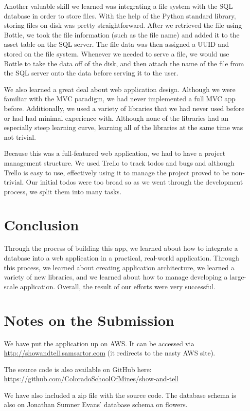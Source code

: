 \documentclass[12pt]{article}
\begin{document}
Another valuable skill we learned was integrating a file system with the SQL
database in order to store files. With the help of the Python standard library,
storing files on disk was pretty straightforward. After we retrieved the file
using Bottle, we took the file information (such as the file name) and added it
to the asset table on the SQL server. The file data was then assigned a UUID and
stored on the file system. Whenever we needed to serve a file, we would use
Bottle to take the data off of the disk, and then attach the name of the file
from the SQL server onto the data before serving it to the user.

We also learned a great deal about web application design. Although we were
familiar with the MVC paradigm, we had never implemented a full MVC app before.
Additionally, we used a variety of libraries that we had never used before or
had had minimal experience with. Although none of the libraries had an
especially steep learning curve, learning all of the libraries at the same time
was not trivial.

Because this was a full-featured web application, we had to have a project
management structure. We used Trello to track todos and bugs and although Trello
is easy to use, effectively using it to manage the project proved to be
non-trivial. Our initial todos were too broad so as we went through the
development process, we split them into many tasks.

\section{Conclusion}
Through the process of building this app, we learned about how to integrate a
database into a web application in a practical, real-world application. Through
this process, we learned about creating application architecture, we learned a
variety of new libraries, and we learned about how to manage developing a
large-scale application. Overall, the result of our efforts were very
successful.

\section{Notes on the Submission}
We have put the application up on AWS. It can be accessed via\\
\url{http://showandtell.samsartor.com} (it redirects to the nasty AWS site).

The source code is also available on GitHub here:\\
\url{https://github.com/ColoradoSchoolOfMines/show-and-tell}

We have also included a zip file with the source code. The database schema is
also on Jonathan Sumner Evans' database schema on flowers.
\end{document}
